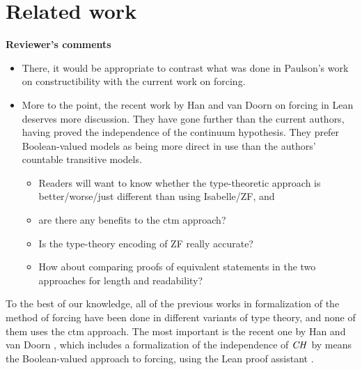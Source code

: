 \section{Related work}
\label{sec:related-work}

\textbf{Reviewer's comments}
{\it
  \begin{itemize}
  \item There, it would be appropriate to contrast what was done in
    Paulson's work on constructibility with the current work on forcing.
  \item More to the point, the recent work by Han and van Doorn on
    forcing in Lean deserves more discussion.  They have gone further
    than the current authors, having proved the independence of the
    continuum hypothesis.  They prefer Boolean-valued models as being
    more direct in use than the authors' countable transitive models.
    \begin{itemize}
    \item Readers will want to know whether the type-theoretic approach
      is better/worse/just different than using Isabelle/ZF, and
    \item are there any benefits to the ctm approach?
    \item Is the type-theory encoding of ZF really accurate?
    \item How about comparing proofs of equivalent statements in the two
      approaches for length and readability?
    \end{itemize}
  \end{itemize}
}

To the best of our knowledge, all of the previous works in
formalization of the method 
of forcing have been done in different variants of type theory, and
none of them uses the ctm approach. The
most important is the recent one by 
Han and van Doorn
\cite{han_et_al:LIPIcs:2019:11074,DBLP:conf/cpp/HanD20}, which includes
a formalization of the independence of $\mathit{CH}$ by means
the Boolean-valued approach to forcing, using the Lean
proof assistant \cite{DBLP:conf/cade/MouraKADR15}.


